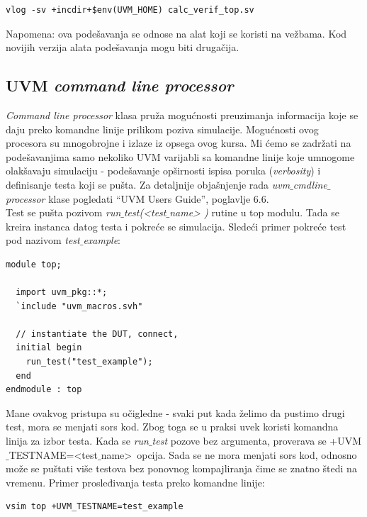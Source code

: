 \begin{lstlisting}
vlog -sv +incdir+$env(UVM_HOME) calc_verif_top.sv
\end{lstlisting}

Napomena: ova podešavanja se odnose na alat koji se koristi na vežbama.
Kod novijih verzija alata podešavanja mogu biti drugačija.


\subsection{UVM \emph{command line processor}}

\emph{Command line processor} klasa pruža mogućnosti preuzimanja informacija
koje se daju preko komandne linije prilikom poziva simulacije. Mogućnosti ovog
procesora su mnogobrojne i izlaze iz opsega ovog kursa. Mi ćemo se zadržati na
podešavanjima samo nekoliko UVM varijabli sa komandne linije koje umnogome
olakšavaju simulaciju - podešavanje opširnosti ispisa poruka (\emph{verbosity})
i definisanje testa koji se pušta. Za detaljnije objašnjenje rada
\emph{uvm\(\_\)cmdline\(\_\)processor} klase pogledati ``UVM Users Guide'',
poglavlje 6.6.\\

Test se pušta pozivom \emph{run\(\_\)test(\textless test\(\_\)name\textgreater
  )} rutine u top modulu. Tada se kreira instanca datog testa i pokreće se
simulacija. Sledeći primer pokreće test pod nazivom \emph{test\(\_\)example}:

\begin{lstlisting}
module top;

  import uvm_pkg::*;
  `include "uvm_macros.svh"

  // instantiate the DUT, connect,
  initial begin
    run_test("test_example");
  end
endmodule : top
\end{lstlisting}

Mane ovakvog pristupa su očigledne - svaki put kada želimo da pustimo drugi
test, mora se menjati sors kod. Zbog toga se u praksi uvek koristi komandna
linija za izbor testa. Kada se \emph{run\(\_\)test} pozove bez argumenta,
proverava se +UVM\(\_\)TESTNAME=\textless test\(\_\)name\textgreater\ opcija.
Sada se ne mora menjati sors kod, odnosno može se puštati više testova bez
ponovnog kompajliranja čime se znatno štedi na vremenu. Primer prosleđivanja
testa preko komandne linije:

\begin{lstlisting}
vsim top +UVM_TESTNAME=test_example
\end{lstlisting}

